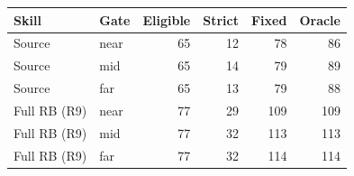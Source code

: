 \begin{tabular}{llrrrr}
\toprule
Skill & Gate & Eligible & Strict & Fixed & Oracle \\
\midrule
Source & near & 65 & 12 & 78 & 86 \\
Source & mid & 65 & 14 & 79 & 89 \\
Source & far & 65 & 13 & 79 & 88 \\
Full RB (R9) & near & 77 & 29 & 109 & 109 \\
Full RB (R9) & mid & 77 & 32 & 113 & 113 \\
Full RB (R9) & far & 77 & 32 & 114 & 114 \\
\bottomrule
\end{tabular}
